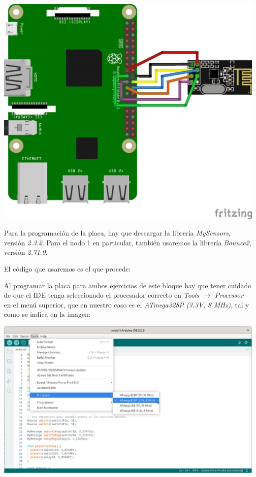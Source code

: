 \includegraphics[width=\linewidth]{rpi-nrf24l01-wiring.jpg}

Para la programación de la placa, hay que descargar la librería
\emph{MySensors}, versión \emph{2.3.2}\footnotemark. Para el nodo 1 en
particular, también usaremos la librería \emph{Bounce2}, versión
\emph{2.71.0}\footnotemark.


El código que usaremos es el que procede:



Al programar la placa para ambos ejercicios de este bloque hay que tener
cuidado de que el IDE tenga seleccionado el procesador correcto en
\emph{Tools $\rightarrow$ Processor} en el menú superior, que en nuestro caso
es el \emph{ATmega328P (3.3V, 8 MHz)}, tal y como se indica en la imagen:

\includegraphics[width=\linewidth]{arduino-ide-processor.png}

